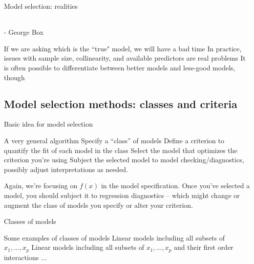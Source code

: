 

\begin{frame}{Model selection: realities}

 \\ - George Box


\bi
    \myitem If we are asking which is the ``true" model, we will have a bad time
	\myitem In practice, issues with sample size, collinearity, and available predictors are real problems
	\myitem It is often possible to differentiate between better models and less-good models, though

\ei
\end{frame}



\subsection{Model selection methods: classes and criteria}




\begin{frame}{Basic idea for model selection}

\begin{block}{A very general algorithm}
\bi
        \myitem Specify a ``class'' of models
        \myitem Define a criterion to quantify the fit of each model in the class
        \myitem Select the model that optimizes the criterion you're using
        \myitem Subject the selected model to model checking/diagnostics, possibly adjust interpretations as needed.
\ei
\end{block}

Again, we're focusing on $f(x)$ in the model specification. Once you've selected a model, you should subject it to regression diagnostics -- which might change or augment the class of models you specify or alter your criterion.

\end{frame}


\begin{frame}{Classes of models}

\begin{block}{Some examples of classes of models}
\bi
        \myitem Linear models including all subsets of $x_1, ..., x_p$
        \myitem Linear models including all subsets of $x_1, ..., x_p$ and their first order interactions
        \myitem ...
\ei
\end{block}

\end{frame}

